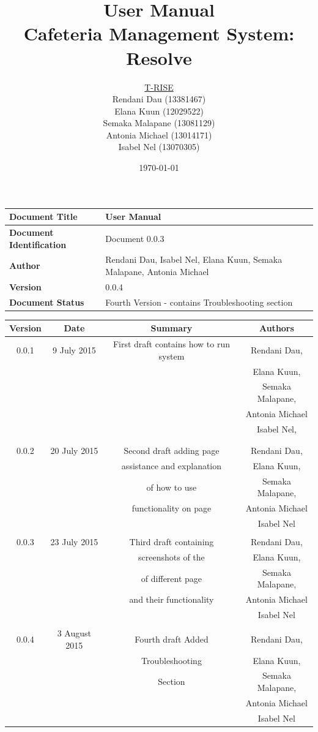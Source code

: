\documentclass[a4paper,12pt]{article}
\title{\Huge User Manual \\ 
	Cafeteria Management System: Resolve}
\author{
         \underline{T-RISE}\\
          Rendani Dau (13381467) \\
	Elana Kuun (12029522) \\
	Semaka Malapane (13081129) \\
	Antonia Michael (13014171) \\
	Isabel Nel (13070305)}
\date{\today}
\begin{document}
\maketitle
\break

\tableofcontents
\break


 \begin{tabu} to 0.8\textwidth { | X[l] | X[l] | }
 \hline
 \textbf{Document Title} & User Manual \\
 \hline
 \textbf{Document Identification}  & Document 0.0.3  \\
 \hline
 \textbf{Author}  & Rendani Dau, Isabel Nel, Elana Kuun, Semaka Malapane, Antonia Michael \\
 \hline
 \textbf{Version} & 0.0.4 \\
 \hline
 \textbf{Document Status} & Fourth Version - contains Troubleshooting section \\
 \hline
 \end{tabu}

\begin{table}[h!]
\centering
 \begin{tabular}{||c c c c||} 
 \hline
 \textbf{Version} & \textbf{Date} & \textbf{Summary} & \textbf{Authors} \\ [0.5ex] 
 \hline\hline
 0.0.1 & 9 July 2015 &  First draft contains how to run system  & Rendani Dau, \\ & & & Elana Kuun, \\ & & & Semaka Malapane, \\ & & & Antonia Michael \\ & & & Isabel Nel, \\ & & & \\
 \hline 
 & & & \\
 0.0.2 & 20 July 2015 &  Second draft adding page  & Rendani Dau, \\ & & assistance and explanation & Elana Kuun, \\ & & of how to use & Semaka Malapane, \\ & & functionality on page &  Antonia Michael \\ & & & Isabel Nel \\   [1ex]  
 \hline 
 & & & \\
 0.0.3& 23 July 2015 &  Third draft containing  & Rendani Dau, \\ & & screenshots of the & Elana Kuun, \\ & & of different page & Semaka Malapane, \\ & & and their functionality &  Antonia Michael \\ & & & Isabel Nel \\   [1ex]  
 \hline
 & & & \\
 0.0.4& 3 August 2015 &  Fourth draft Added  & Rendani Dau, \\ & & Troubleshooting & Elana Kuun, \\ & & Section & Semaka Malapane, \\ & &  &  Antonia Michael \\ & & & Isabel Nel \\   [1ex]  
 \hline
 \end{tabular}
\end{table}
\end{document}
